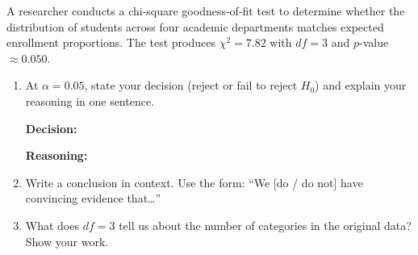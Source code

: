 \documentclass[10pt]{article}
\begin{document}
\namedateperiod

\vspace{0.15in}

A researcher conducts a chi-square goodness-of-fit test to determine whether the
distribution of students across four academic departments matches expected enrollment
proportions. The test produces $\chi^2 = 7.82$ with $df = 3$ and $p$-value $\approx 0.050$.

\begin{enumerate}

  \item At $\alpha = 0.05$, state your decision (reject or fail to reject $H_0$)
        and explain your reasoning in one sentence.

        \textbf{Decision:} \blank{3cm}

        \textbf{Reasoning:}

  \item Write a conclusion in context. Use the form:
        ``We [do / do not] have convincing evidence that\ldots''


  \item What does $df = 3$ tell us about the number of categories in the
        original data? Show your work.


\end{enumerate}
\end{document}
